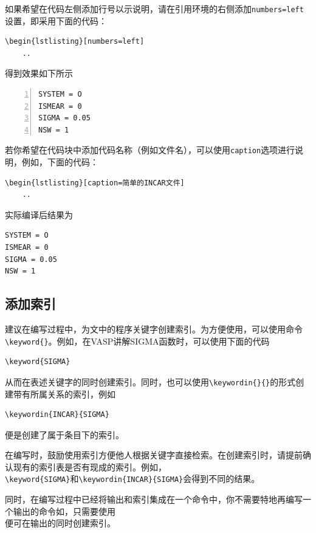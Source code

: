 如果希望在代码左侧添加行号以示说明，请在引用环境的右侧添加\verb|numbers=left|设置，即采用下面的代码：

\begin{lstlisting}[frame=line]
\begin{lstlisting}[numbers=left]
    ..
\end{lstlisting}

得到效果如下所示

\begin{lstlisting}[numbers=left]
SYSTEM = O
ISMEAR = 0
SIGMA = 0.05
NSW = 1
\end{lstlisting}

\begin{attention}
    若你希望在代码块中添加代码名称（例如文件名），可以使用\verb|caption|选项进行说明，例如，下面的代码：
    \begin{lstlisting}[frame=line]
\begin{lstlisting}[caption=简单的INCAR文件]
    ..        
    \end{lstlisting}

    实际编译后结果为
    \begin{lstlisting}[caption=简单的INCAR文件]
SYSTEM = O
ISMEAR = 0
SIGMA = 0.05
NSW = 1
    \end{lstlisting}

\end{attention}

\subsection{添加索引}\label{subsec:关于如何使用LaTeX编写模板-添加索引}

建议在编写过程中，为文中的程序关键字创建索引。为方便使用，可以使用命令\verb|\keyword{}|。例如，在VASP讲解SIGMA函数时，可以使用下面的代码

\begin{lstlisting}[frame=line]
\keyword{SIGMA}
\end{lstlisting}

从而在表述关键字的同时创建索引。同时，也可以使用\verb|\keywordin{}{}|的形式创建带有所属关系的索引，例如

\begin{lstlisting}[frame=line]
\keywordin{INCAR}{SIGMA}
\end{lstlisting}

便是创建了属于条目下的索引。

\begin{attention}
    在编写时，鼓励使用索引方便他人根据关键字直接检索。在创建索引时，请提前确认现有的索引表是否有现成的索引。例如，\\\verb|\keyword{SIGMA}|和\verb|\keywordin{INCAR}{SIGMA}|会得到不同的结果。

    同时，在编写过程中已经将输出和索引集成在一个命令中，你不需要特地再编写一个输出的命令如，只需要使用\\便可在输出的同时创建索引。
\end{attention}

